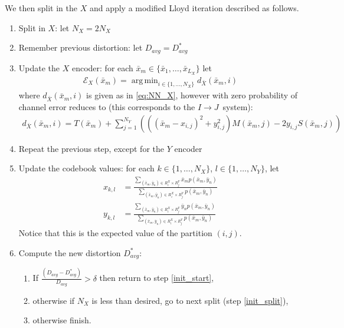 \documentclass[10pt,twoside,titlepage]{article}
\newcommand{\sysIJ}{\mbox{$I \rightarrow J$}}
\DeclareMathOperator*{\argmin}{arg\,min}
\begin{document}
We then split in the $X$ and apply a modified Lloyd iteration described as follows.
\begin{enumerate}
    
    \item \label{init_split} Split in $X$: let $N_X=2N_X$
    \item \label{init_start} Remember previous distortion: let $D_{avg}=D^*_{avg}$
    \item Update the $X$ encoder: for each $\bar x_m\in\{\bar x_1,\ldots,\bar x_{L_X}\}$ let
    \begin{align}
        \mathcal E_X(\bar x_m) = \argmin_{i \in \{1,\dots,N_X\}}d_{\bar X}(\bar x_m,i)
    \end{align}
    where $d_{\bar X}(\bar x_m,i)$ is given as in \eqref{eq:NN_X}, however with zero probability of channel error reduces to (this corresponds to the \sysIJ\ system):
    \begin{align}
        \label{eq:no_channel_NN_X}
        d_{\bar X}(\bar x_m,i) =
            T(\bar x_m) + 
            \sum_{j=1}^{N_Y}
            \left(\left({(\bar x_m-x_{i,j})}^2 +
            y_{i,j}^2\right)M(\bar x_m, j) -2y_{i,j}S(\bar x_m, j)\right)
    \end{align}
    \item Repeat the previous step, except for the $Y$ encoder
    \item Update the codebook values: for each $k\in \{1,\ldots,N_X\}$, $l\in\{1,\ldots,N_Y\}$, let
    \begin{align}
        x_{k,l} &= 
            \frac{\sum_{(\bar x_m,\bar y_n)\in R_i^X\times R_j^Y}\bar x_m p(\bar x_m,\bar y_n)}
            {\sum_{(\bar x_m,\bar y_n)\in R_i^X\times R_j^Y}p(\bar x_m,\bar y_n)} \\
        y_{k,l} &= 
            \frac{\sum_{(\bar x_m,\bar y_n)\in R_i^X\times R_j^Y}\bar y_n p(\bar x_m,\bar y_n)}
            {\sum_{(\bar x_m,\bar y_n)\in R_i^X\times R_j^Y}p(\bar x_m,\bar y_n)}
    \end{align}
    Notice that this is the expected value of the partition $(i,j)$.
    \item Compute the new distortion $D^*_{avg}$:
    \begin{enumerate}
        \item
        If
        $\frac
        {(D_{avg} - D^*_{avg})}
        {D_{avg}}
        > \delta$
        then return to step \ref{init_start},
        \item
        otherwise if $N_X$ is less than desired, go to next split (step \ref{init_split}),
        \item
        otherwise finish.
    \end{enumerate}
\end{enumerate}
\end{document}
